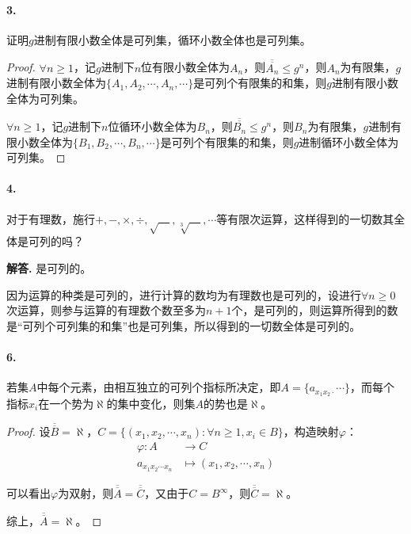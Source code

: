 \documentclass[12pt, a4paper, oneside]{ctexart}
\newenvironment{solution}{\par\noindent\textbf{解答. }}{\bigskip\par}
\begin{document}
\paragraph{3.}证明$g$进制有限小数全体是可列集，循环小数全体也是可列集。
\begin{proof}
    $\forall n\geqslant 1$，记$g$进制下$n$位有限小数全体为$A_n$，则$\overline{\overline{A_n}}\leqslant g^n$，则$A_n$为有限集，$g$进制有限小数全体为$\{A_1,A_2,\cdots,A_n,\cdots\}$是可列个有限集的和集，则$g$进制有限小数全体为可列集。

    $\forall n\geqslant 1$，记$g$进制下$n$位循环小数全体为$B_n$，则$\overline{\overline{B_n}}\leqslant g^n$，则$B_n$为有限集，$g$进制有限小数全体为$\{B_1,B_2,\cdots,B_n,\cdots\}$是可列个有限集的和集，则$g$进制循环小数全体为可列集。
\end{proof}
\paragraph{4.}对于有理数，施行$+,-,\times,\div,\sqrt{\quad},\sqrt[3]{\quad},\cdots$等有限次运算，这样得到的一切数其全体是可列的吗？
\begin{solution}
    是可列的。

    因为运算的种类是可列的，进行计算的数均为有理数也是可列的，设进行$\forall n\geqslant 0$次运算，则参与运算的有理数个数至多为$n+1$个，是可列的，则运算所得到的数是“可列个可列集的和集”也是可列集，所以得到的一切数全体是可列的。
\end{solution}
\paragraph{6.}若集$A$中每个元素，由相互独立的可列个指标所决定，即$A=\{a_{x_1x_2\cdot}\cdots\}$，而每个指标$x_i$在一个势为$\aleph$的集中变化，则集$A$的势也是$\aleph$。
\begin{proof}
    设$\overline{\overline{B}} = \aleph$，$C=\{(x_1,x_2,\cdots,x_n):\forall n\geqslant 1, x_i\in B\}$，构造映射$\varphi$：
    \begin{equation*}
        \begin{aligned}
            \varphi:A&\rightarrow C\\
            a_{x_1x_2\cdots x_n}&\mapsto(x_1,x_2,\cdots,x_n)
        \end{aligned}
    \end{equation*}

    可以看出$\varphi$为双射，则$\overline{\overline{A}} = \overline{\overline{C}}$，又由于$C=B^{\infty}$，则$\overline{\overline{C}} = \aleph$。
    
    综上，$\overline{\overline{A}} = \aleph$。
\end{proof}
\end{document}
